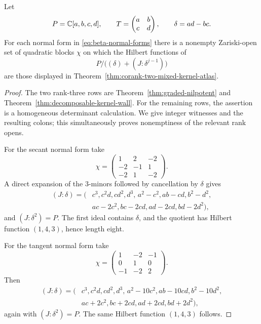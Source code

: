 \begin{lemma}
\label{lem:nine-orbit-colons}
Let
\[
 P=\mathbb C[a,b,c,d],\qquad
 T=\begin{pmatrix}a&b\\c&d\end{pmatrix},\qquad
 \delta=ad-bc.
\]
For each normal form in \eqref{eq:beta-normal-forms} there is a
nonempty Zariski-open set of quadratic blocks \(\chi\) on which the
Hilbert functions of
\[
 P/\bigl((\delta)+(J:\delta^{j-1})\bigr)
\]
are those displayed in
Theorem~\ref{thm:corank-two-mixed-kernel-atlas}.
\end{lemma}

\begin{proof}
The two rank-three rows are
Theorem~\ref{thm:graded-nilpotent} and
Theorem~\ref{thm:decomposable-kernel-wall}.  For the remaining rows,
the assertion is a homogeneous determinant calculation.  We give
integer witnesses and the resulting colons; this simultaneously
proves nonemptiness of the relevant rank opens.

For the secant normal form take
\[
 \chi=
 \begin{pmatrix}
  1&2&-2\\-2&-1&1\\-2&1&-2
 \end{pmatrix}.
\]
A direct expansion of the \(3\)-minors followed by cancellation by
\(\delta\) gives
\[
\begin{split}
 (J:\delta)=(&c^3,c^2d,cd^2,d^3,\,
 a^2-c^2,ab-cd,b^2-d^2,\\
 &ac-2c^2,bc-2cd,ad-2cd,bd-2d^2),
\end{split}
\]
and \((J:\delta^2)=P\).  The first ideal contains \(\delta\), and
the quotient has Hilbert function \((1,4,3)\), hence length eight.

For the tangent normal form take
\[
 \chi=
 \begin{pmatrix}
  1&-2&-1\\0&1&0\\-1&-2&2
 \end{pmatrix}.
\]
Then
\[
\begin{split}
 (J:\delta)=(&c^3,c^2d,cd^2,d^3,\,
 a^2-10c^2,ab-10cd,b^2-10d^2,\\
 &ac+2c^2,bc+2cd,ad+2cd,bd+2d^2),
\end{split}
\]
again with \((J:\delta^2)=P\).  The same Hilbert function
\((1,4,3)\) follows.


\end{proof}
